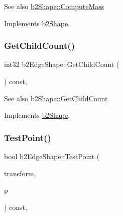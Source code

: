 \begin{DoxySeeAlso}{See also}
\hyperlink{classb2_shape_a61b365526241b47f124789b0309cac69}{b2\+Shape\+::\+Compute\+Mass} 
\end{DoxySeeAlso}


Implements \hyperlink{classb2_shape_a61b365526241b47f124789b0309cac69}{b2\+Shape}.

\mbox{\label{classb2_edge_shape_ae9dcaa2f4b77fcf182d29159658da82a}} 
\subsubsection{\texorpdfstring{Get\+Child\+Count()}{GetChildCount()}}
{\footnotesize\ttfamily int32 b2\+Edge\+Shape\+::\+Get\+Child\+Count (\begin{DoxyParamCaption}{ }\end{DoxyParamCaption}) const\hspace{0.3cm}{\ttfamily [override]}, {\ttfamily [virtual]}}

\begin{DoxySeeAlso}{See also}
\hyperlink{classb2_shape_a05a3c445017d96df9238ceefe6ce37ab}{b2\+Shape\+::\+Get\+Child\+Count} 
\end{DoxySeeAlso}


Implements \hyperlink{classb2_shape_a05a3c445017d96df9238ceefe6ce37ab}{b2\+Shape}.

\mbox{\label{classb2_edge_shape_a15151673cf9ad585779c70363425f470}} 
\subsubsection{\texorpdfstring{Test\+Point()}{TestPoint()}}
{\footnotesize\ttfamily bool b2\+Edge\+Shape\+::\+Test\+Point (\begin{DoxyParamCaption}\item[{const \hyperlink{structb2_transform}{b2\+Transform} \&}]{transform,  }\item[{const \hyperlink{structb2_vec2}{b2\+Vec2} \&}]{p }\end{DoxyParamCaption}) const\hspace{0.3cm}{\ttfamily [override]}, {\ttfamily [virtual]}}

